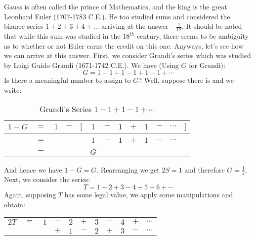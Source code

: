     \begin{example}
        \label{ex:Logic_Euler_Sum}%
        Gauss is often called the prince of Mathematics, and the king is the
        great Leonhard Euler (1707-1783 C.E.). He too
        studied sums and considered the bizarre series $1+2+3+4+\dots$ arriving
        at the answer $\minus\frac{1}{12}$. It should be noted that while this
        sum was studied in the $18^{th}$ century, there seems to be ambiguity as
        to whether or not Euler earns the credit on this one. Anyways, let's
        see how we can arrive at this answer. First, we consider
        Grandi's series which was studied by
        Luigi Guido Grandi (1671-1742 C.E.). We have
        (Using $G$ for Grandi):
        \begin{equation}
            G=1-1+1-1+1-1+\cdots
        \end{equation}
        Is there a meaningful number to assign to $G$? Well, suppose there is
        and we write:
        \begin{table}[H]
            \centering
            \captionsetup{type=table}
            \begin{tabular}{ccccccccccccc}
                $1-G$&$=$&$1$&$-$&$\Big[$&$1$&$-$&$1$&$+$&$1$&$-$&$\cdots$
                    &$\Big]$\\[1ex]
                \hline\\
                    &$=$&&&&$1$&$-$&$1$&$+$&$1$&$-$&$\cdots$\\[1ex]
                \hline\\
                &$=$&&&&$G$
            \end{tabular}
            \caption{Grandi's Series $1-1+1-1+\cdots$}
        \end{table}
        And hence we have $1-G=G$. Rearranging we get $2S=1$ and therefore
        $G=\frac{1}{2}$. Next, we consider the series:
        \begin{equation}
            T=1-2+3-4+5-6+\cdots
        \end{equation}
        Again, supposing $T$ has some legal value, we apply some manipulations
        and obtain:
        \begin{table}[H]
            \centering
            \captionsetup{type=table}
            \begin{tabular}{ccccccccccc}
                $2T$&$=$&$1$&$-$&$2$&$+$&$3$&$-$&$4$&$+$&$\cdots$\\
                    &   &   &$+$&$1$&$-$&$2$&$+$&$3$&$-$&$\cdots$\\

\end{tabular}
\end{table}
\end{example}
